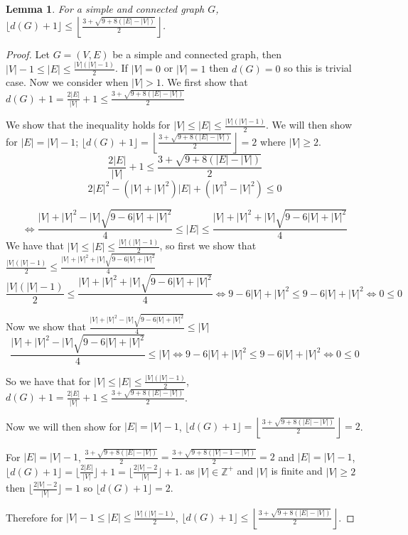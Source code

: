 \documentclass{article}
\newtheorem{lemma}{Lemma}
\begin{document}
\begin{lemma}\label{lemImpov}
    For a simple and connected graph $G$, $\lfloor d(G)+1 \rfloor \leq \left\lfloor \frac{3+\sqrt{9+8(|E|-|V|)}}{2} \right\rfloor$.
\end{lemma}

\begin{proof}
    Let $G = (V,E)$ be a simple and connected graph, then $|V|-1 \leq |E| \leq \frac{|V|(|V|-1)}{2}$. If $|V| = 0$ or $|V|=1$ then $d(G) = 0$ so this is trivial case. Now we consider when $|V| > 1$.
    We first show that $d(G)+1 = \frac{2|E|}{|V|} + 1 \leq  \frac{3+\sqrt{9+8(|E|-|V|)}}{2}$ 

    We show that the inequality holds for $|V| \leq |E| \leq \frac{|V|(|V|-1)}{2}$. We will then show for $|E| = |V|-1$; $\lfloor d(G)+1 \rfloor = \left\lfloor \frac{3+\sqrt{9+8(|E|-|V|)}}{2} \right\rfloor =2$ where $|V| \geq 2$.
    $$\frac{2|E|}{|V|} + 1  \leq  \frac{3+\sqrt{9+8(|E|-|V|)}}{2}$$
    $$2|E|^2 - (|V|+|V|^2)|E| + (|V|^3-|V|^2) \leq 0$$
   
    $$\iff \frac{|V|+|V|^2-|V|\sqrt{9-6|V|+|V|^2}}{4} \leq |E| \leq \frac{|V|+|V|^2+|V|\sqrt{9-6|V|+|V|^2}}{4}$$
    We have that $|V| \leq |E| \leq \frac{|V|(|V|-1)}{2}$, so first we show that 
    $\frac{|V|(|V|-1)}{2} \leq \frac{|V|+|V|^2+|V|\sqrt{9-6|V|+|V|^2}}{4}$
    $$\frac{|V|(|V|-1)}{2} \leq \frac{|V|+|V|^2+|V|\sqrt{9-6|V|+|V|^2}}{4} \iff 9-6|V|+|V|^2 \leq 9-6|V|+|V|^2 \iff 0 \leq 0$$
   
    Now we show that $\frac{|V|+|V|^2-|V|\sqrt{9-6|V|+|V|^2}}{4} \leq |V|$
    $$\frac{|V|+|V|^2-|V|\sqrt{9-6|V|+|V|^2}}{4} \leq |V| \iff 9-6|V|+|V|^2 \leq 9-6|V|+|V|^2 \iff 0 \leq 0$$
   
    So we have that for $|V| \leq |E| \leq \frac{|V|(|V|-1)}{2}$, \;$d(G)+1 = \frac{2|E|}{|V|} + 1 \leq  \frac{3+\sqrt{9+8(|E|-|V|)}}{2}$.
    
    Now we will then show for $|E| = |V|-1$, $\lfloor d(G)+1 \rfloor = \left\lfloor \frac{3+\sqrt{9+8(|E|-|V|)}}{2} \right\rfloor = 2$.
    
    For \;$|E| = |V|-1$, $\frac{3+\sqrt{9+8(|E|-|V|)}}{2} = \frac{3+\sqrt{9+8(|V|-1-|V|)}}{2} = 2$ \;and 
    \;$|E| = |V|-1$, $\lfloor d(G)+1 \rfloor = \lfloor \frac{2|E|}{|V|} \rfloor + 1  = \lfloor \frac{2|V| - 2}{|V|} \rfloor + 1$.
    as $|V| \in \mathbb{Z}^+$ and $|V|$ is finite and $|V| \geq 2$ then $\lfloor \frac{2|V| - 2}{|V|} \rfloor = 1$
    so $\lfloor d(G)+1 \rfloor = 2$.
  
    Therefore for $|V|-1 \leq |E| \leq \frac{|V|(|V|-1)}{2}$,  $\lfloor d(G)+1 \rfloor \leq \left\lfloor \frac{3+\sqrt{9+8(|E|-|V|)}}{2} \right\rfloor$.
    
\end{proof}
\end{document}
